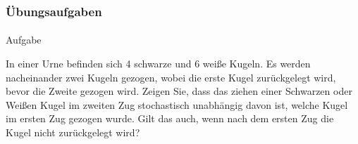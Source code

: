 \documentclass{beamer}
\begin{document}
\begin{frame}
    \frametitle{Übungsaufgaben}
\framesubtitle{}
\begin{block}{Aufgabe}

In einer Urne befinden sich 4 schwarze und 6 weiße Kugeln.
Es werden nacheinander zwei Kugeln gezogen, wobei die erste Kugel zurückgelegt wird, bevor die Zweite gezogen wird.
Zeigen Sie, dass das ziehen einer Schwarzen oder Weißen Kugel im zweiten Zug stochastisch unabhängig davon ist, welche Kugel im ersten Zug  gezogen wurde.
Gilt das auch, wenn nach dem ersten Zug die Kugel nicht zurückgelegt wird?


\end{block}
 \end{frame}
\end{document}
